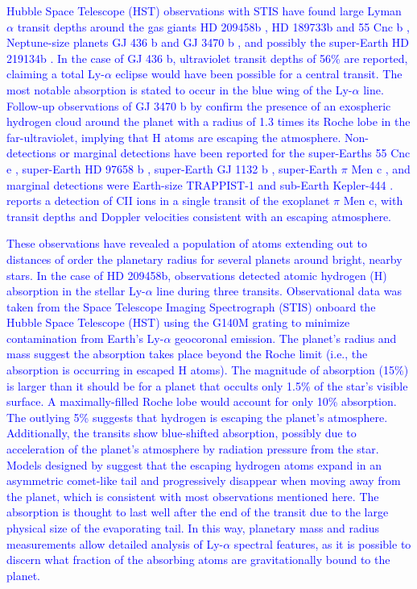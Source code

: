 \documentclass{aastex63}
\newcommand{\proposed}[1]{\textcolor{blue}{#1}}
\begin{document}
\proposed{
Hubble Space Telescope (HST) observations with STIS have found large Lyman $\alpha$ transit depths around the gas giants HD 209458b \citep{2003Natur.422..143V}, HD 189733b \citep{2012A&A...543L...4L} and 55 Cnc b \citep{2012A&A...547A..18E}, Neptune-size planets GJ 436 b
\citep{2015Natur.522..459E}
and GJ 3470 b \citep{2018A&A...620A.147B}, and possibly the super-Earth HD 219134b \citep{2019EPSC...13.1928L}. In the case of GJ 436 b, ultraviolet transit depths of 56\% are reported, claiming a total Ly-$\alpha$ eclipse would have been possible for a central transit. The most notable absorption is stated to occur in the blue wing of the Ly-$\alpha$ line. Follow-up observations of GJ 3470 b by \citet{2021arXiv210309864B} confirm the presence of an exospheric hydrogen cloud around the planet with a radius of 1.3 times its Roche lobe in the far-ultraviolet, implying that H atoms are escaping the atmosphere. 
Non-detections or marginal detections have been reported for the super-Earths 55 Cnc e \citep{2012A&A...547A..18E}, super-Earth HD 97658 b \citep{2017A&A...597A..26B} , super-Earth GJ 1132 b \citep{2019AJ....158...50W}, super-Earth $\pi$ Men c \citep{2020ApJ...888L..21G}, and marginal detections were Earth-size TRAPPIST-1 \citep{2017A&A...599L...3B} and sub-Earth Kepler-444 \citep{2017A&A...602A.106B}.  \cite{2021ApJ...907L..36M} reports a detection of CII ions in a single transit of the exoplanet $\pi$ Men c, with transit depths and Doppler velocities consistent with an escaping atmosphere.
}

\proposed{
These observations have revealed a population of atoms extending out to distances of order the planetary radius for several planets around bright, nearby stars. In the case of HD 209458b, observations detected atomic hydrogen (H) absorption in the stellar Ly-$\alpha$ line during three transits. Observational data was taken from the Space Telescope Imaging Spectrograph (STIS) onboard the Hubble Space Telescope (HST) using the G140M grating to minimize contamination from Earth's Ly-$\alpha$ geocoronal emission. The planet's radius and mass suggest the absorption takes place beyond the Roche limit (i.e., the absorption is occurring in escaped H atoms). The magnitude of absorption (15\%) is larger than it should be for a planet that occults only 1.5\% of the star's visible surface. A maximally-filled Roche lobe would account for only 10\% absorption. The outlying 5\% suggests that hydrogen is escaping the planet's atmosphere. Additionally, the transits show blue-shifted absorption, possibly due to acceleration of the planet’s atmosphere by radiation pressure from the star. Models designed by \citet{2003Natur.422..143V} suggest that the escaping hydrogen atoms expand in an asymmetric comet-like tail and progressively disappear when moving away from the planet, which is consistent with most observations mentioned here. The absorption is thought to last well after the end of the transit due to the large physical size of the evaporating tail. In this way, planetary mass and radius measurements allow detailed analysis of Ly-$\alpha$ spectral features, as it is possible to discern what fraction of the absorbing atoms are gravitationally bound to the planet.
}
\end{document}
